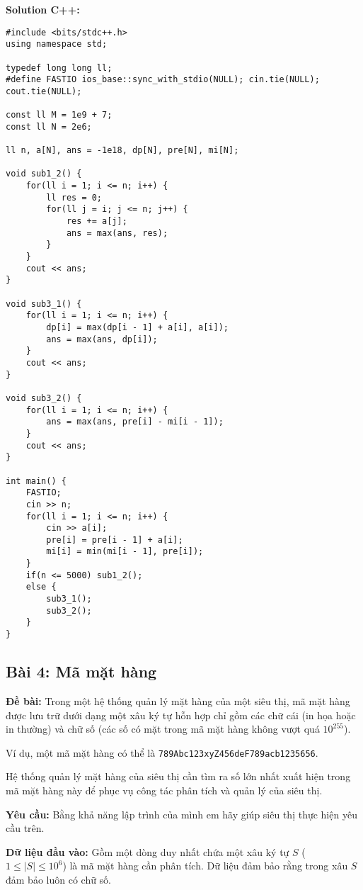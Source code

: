 \documentclass[12pt]{scrartcl}  %
\begin{document}
\textbf{Solution C++:}
\begin{lstlisting}
#include <bits/stdc++.h>
using namespace std;

typedef long long ll;
#define FASTIO ios_base::sync_with_stdio(NULL); cin.tie(NULL); cout.tie(NULL);

const ll M = 1e9 + 7;
const ll N = 2e6;

ll n, a[N], ans = -1e18, dp[N], pre[N], mi[N];

void sub1_2() {
    for(ll i = 1; i <= n; i++) {
        ll res = 0;
        for(ll j = i; j <= n; j++) {
            res += a[j];
            ans = max(ans, res);
        }
    }
    cout << ans;
}

void sub3_1() {
    for(ll i = 1; i <= n; i++) {
        dp[i] = max(dp[i - 1] + a[i], a[i]);
        ans = max(ans, dp[i]);
    }
    cout << ans;
}

void sub3_2() {
    for(ll i = 1; i <= n; i++) {
        ans = max(ans, pre[i] - mi[i - 1]);
    }
    cout << ans;
}

int main() {
    FASTIO;
    cin >> n;
    for(ll i = 1; i <= n; i++) {
        cin >> a[i];
        pre[i] = pre[i - 1] + a[i];
        mi[i] = min(mi[i - 1], pre[i]);
    }
    if(n <= 5000) sub1_2();
    else {
        sub3_1();
        sub3_2();
    }
}

\end{lstlisting}

\subsection{Bài 4: Mã mặt hàng}

\textbf{Đề bài:}
Trong một hệ thống quản lý mặt hàng của một siêu thị, mã mặt hàng được lưu trữ dưới dạng một xâu ký tự hỗn hợp chỉ gồm các chữ cái (in họa hoặc in thường) và 
chữ số (các số có mặt trong mã mặt hàng không vượt quá $10^{255}$). 

Ví dụ, một mã mặt hàng có thể là \texttt{789Abc123xyZ456deF789acb1235656}.

Hệ thống quản lý mặt hàng của siêu thị cần tìm ra số lớn nhất xuất hiện trong mã mặt hàng này để phục vụ công tác phân tích và quản lý của siêu thị.

\textbf{Yêu cầu:}
Bằng khả năng lập trình của mình em hãy giúp siêu thị thực hiện yêu cầu trên. 

\textbf{Dữ liệu đầu vào:}
Gồm một dòng duy nhất chứa một xâu ký tự $S$ ($1 \leq |S| \leq 10^6$) là mã mặt hàng cần phân tích. Dữ liệu đảm bảo rằng trong xâu $S$ đảm bảo luôn có chữ số. 
\end{document}

